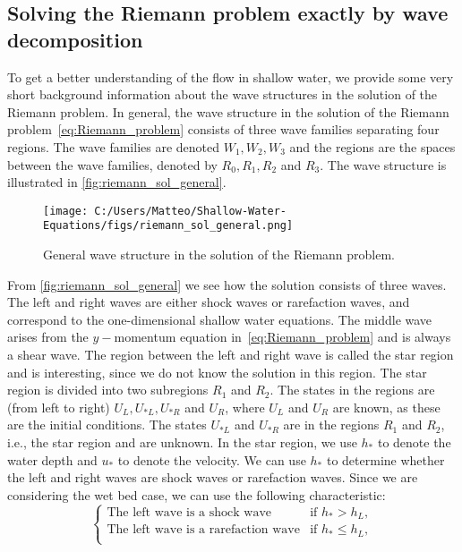 \subsection{Solving the Riemann problem exactly by wave decomposition}
To get a better understanding of the flow in shallow water, we provide some very short background information about the wave structures in the solution of the Riemann problem.
In general, the wave structure in the solution of the Riemann problem~\eqref{eq:Riemann_problem} consists of three wave families separating four regions.
The wave families are denoted $W_1, W_2, W_3$ and the regions are the spaces between the wave families, denoted by $R_0, R_1, R_2$ and $R_3$.
The wave structure is illustrated in \autoref{fig:riemann_sol_general}.
\begin{figure}[H]
    \centering
    \texttt{[image: C:/Users/Matteo/Shallow-Water-Equations/figs/riemann\_sol\_general.png]}
    \caption{General wave structure in the solution of the Riemann problem.}\label{fig:riemann_sol_general}
\end{figure}
From \autoref{fig:riemann_sol_general} we see how the solution consists of three waves.
The left and right waves are either shock waves or rarefaction waves, and correspond to the one-dimensional shallow water equations.
The middle wave arises from the $y-$momentum equation in~\eqref{eq:Riemann_problem} and is always a shear wave.
The region between the left and right wave is called the star region and is interesting, since we do not know the solution in this region.
The star region is divided into two subregions $R_1$ and $R_2$.
The states in the regions are (from left to right) $U_L, U_{*L}, U_{*R}$ and $U_R$, where $U_L$ and $U_R$ are known, as these are the initial conditions.
The states $U_{*L}$ and $U_{*R}$ are in the regions $R_1$ and $R_2$, i.e., the star region and are unknown.
In the star region, we use $h_*$ to denote the water depth and $u_*$ to denote the velocity.
We can use $h_*$ to determine whether the left and right waves are shock waves or rarefaction waves.
Since we are considering the wet bed case, we can use the following characteristic:
\begin{equation*}
    \begin{cases}
        \text{The left wave is a shock wave} & \text{if } h_* > h_L, \\
        \text{The left wave is a rarefaction wave} & \text{if } h_* \leq h_L, \\        
    \end{cases} 
\end{equation*}
